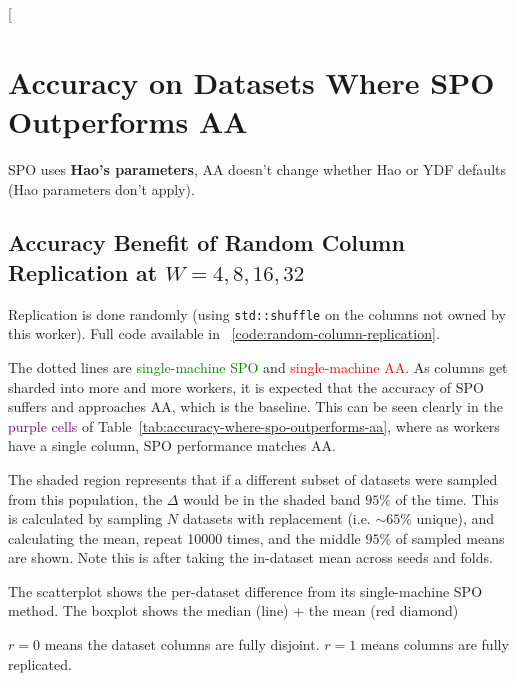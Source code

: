 \documentclass[sigconf,screen]{acmart}
\makeatletter
\newcommand{\floatblock}{\let\@vspace\@vspace@orig\let\@vspacer\@vspacer@orig}
\makeatother
\begin{document}
\twocolumn[{\floatblock
\section{Accuracy on Datasets Where SPO Outperforms AA}
\label{sec:accuracy-where-spo-outperforms-aa}

SPO uses \textbf{Hao's parameters}, AA doesn't change whether Hao or YDF defaults (Hao parameters don't apply).

\subsection{Accuracy Benefit of Random Column Replication at $W=4,8,16,32$}

Replication is done randomly (using \texttt{std::shuffle} on the columns not owned by this worker). Full code available in ~\ref{code:random-column-replication}.

The dotted lines are \textcolor{green}{single-machine SPO} and \textcolor{red}{single-machine AA}. As columns get sharded into more and more workers, it is expected that the accuracy of SPO suffers and approaches AA, which is the baseline. This can be seen clearly in the \textcolor{purple}{purple cells} of Table~\ref{tab:accuracy-where-spo-outperforms-aa}, where as workers have a single column, SPO performance matches AA.

The shaded region represents that if a different subset of datasets were sampled from this population, the $\Delta$ would be in the shaded band $95\%$ of the time. This is calculated by sampling $N$ datasets with replacement (i.e. $\sim 65\%$ unique), and calculating the mean, repeat 10000 times, and the middle $95\%$ of sampled means are shown. Note this is after taking the in-dataset mean across seeds and folds.

The scatterplot shows the per-dataset difference from its single-machine SPO method. The boxplot shows the median (line) + the mean (red diamond)

$r=0$ means the dataset columns are fully disjoint. $r=1$ means columns are fully replicated.

}
\end{document}
